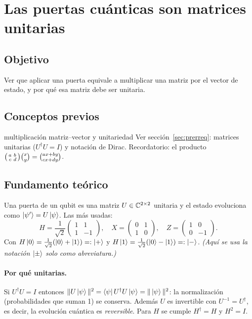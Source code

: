 \def\tituloconcepto{Las puertas cuánticas son matrices unitarias}


\section{Las puertas cuánticas son matrices unitarias}

\subsection{Objetivo}
Ver que aplicar una puerta equivale a multiplicar una matriz por el vector de
estado, y por qué esa matriz debe ser unitaria.

\subsection{Conceptos previos}
\begin{concepto}{multiplicación matriz--vector y unitariedad}
Ver sección~\ref{sec:prerreq}: matrices unitarias ($U^\dagger U=I$) y notación
de Dirac. Recordatorio: el producto
$\begin{psmallmatrix}a&b\\c&d\end{psmallmatrix}\binom xy=\binom{ax+by}{cx+dy}$.
\end{concepto}

\subsection{Fundamento teórico}
Una puerta de un qubit es una matriz $U\in\mathbb{C}^{2\times2}$ unitaria y el estado
evoluciona como $\left|\psi'\right\rangle=U\left|\psi\right\rangle$. Las más usadas:
\begin{equation}
H=\frac1{\sqrt2}\begin{pmatrix}1&1\\1&-1\end{pmatrix},\quad
X=\begin{pmatrix}0&1\\1&0\end{pmatrix},\quad
Z=\begin{pmatrix}1&0\\0&-1\end{pmatrix}.
\end{equation}
Con $H\left|0\right\rangle=\frac1{\sqrt2}(\left|0\right\rangle+\left|1\right\rangle)=:\left|+\right\rangle$ y
$H\left|1\right\rangle=\frac1{\sqrt2}(\left|0\right\rangle-\left|1\right\rangle)=:\left|-\right\rangle$. \emph{(Aquí se usa la notación
$\left|\pm\right\rangle$ solo como abreviatura.)}

\paragraph{Por qué unitarias.} Si $U^\dagger U=I$ entonces
$\|U\left|\psi\right\rangle\|^2=\left\langle\psi\right| U^\dagger U\left|\psi\right\rangle=\|\left|\psi\right\rangle\|^2$: la
normalización (probabilidades que suman 1) se conserva. Además $U$ es
invertible con $U^{-1}=U^\dagger$, es decir, la evolución cuántica es
\emph{reversible}. Para $H$ se cumple $H^\dagger=H$ y $H^2=I$.

